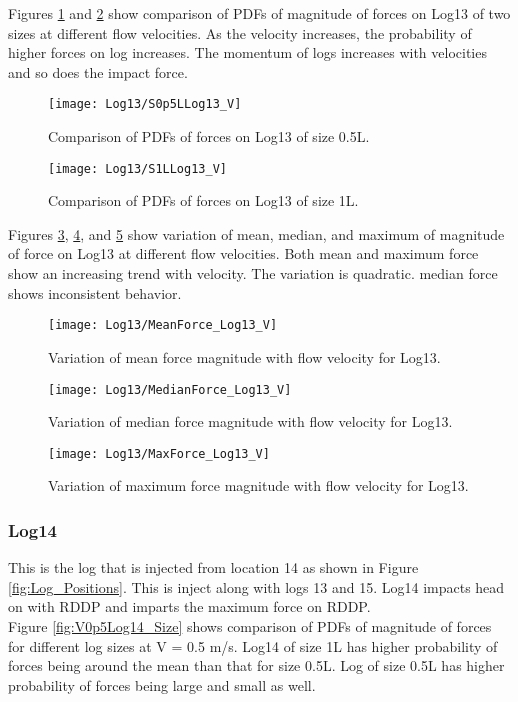 \noindent Figures \ref{fig:S0p5LLog13_V} and \ref{fig:S1LLog13_V} show comparison of PDFs of magnitude of forces on Log13 of two sizes at different flow velocities. As the velocity increases, the probability of higher forces on log increases. The momentum of logs increases with velocities and so does the impact force.

\begin{figure}
\centering
\texttt{[image: Log13/S0p5LLog13\_V]}
\caption{\label{fig:S0p5LLog13_V}Comparison of PDFs of forces on Log13 of size 0.5L.}
\end{figure}
\begin{figure}
\centering
\texttt{[image: Log13/S1LLog13\_V]}
\caption{\label{fig:S1LLog13_V}Comparison of PDFs of forces on Log13 of size 1L.}
\end{figure}

\noindent Figures \ref{fig:MeanForce_Log13_V}, \ref{fig:MedianForce_Log13_V}, and \ref{fig:MaxForce_Log13_V} show variation of mean, median, and maximum of magnitude of force on Log13 at different flow velocities. Both mean and maximum force show an increasing trend with velocity. The variation is quadratic. median force shows inconsistent behavior.

\begin{figure}
\centering
\texttt{[image: Log13/MeanForce\_Log13\_V]}
\caption{\label{fig:MeanForce_Log13_V}Variation of mean force magnitude with flow velocity for Log13.}
\end{figure}
\begin{figure}
\centering
\texttt{[image: Log13/MedianForce\_Log13\_V]}
\caption{\label{fig:MedianForce_Log13_V}Variation of median force magnitude with flow velocity for Log13.}
\end{figure}
\begin{figure}
\centering
\texttt{[image: Log13/MaxForce\_Log13\_V]}
\caption{\label{fig:MaxForce_Log13_V}Variation of maximum force magnitude with flow velocity for Log13.}
\end{figure}

\FloatBarrier
\subsubsection{Log14}
This is the log that is injected from location 14 as shown in Figure \ref{fig:Log_Positions}. This is inject along with logs 13 and 15. Log14 impacts head on with RDDP and imparts the maximum force on RDDP.\\ 
Figure \ref{fig:V0p5Log14_Size} shows comparison of PDFs of magnitude of forces for different log sizes at V = 0.5 m/s. Log14 of size 1L has higher probability of forces being around the mean than that for size 0.5L. Log of size 0.5L has higher probability of forces being large and small as well.

